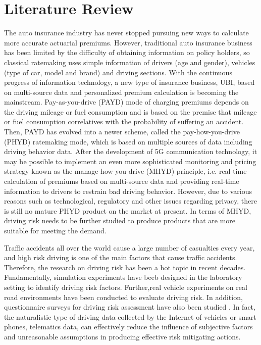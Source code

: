 \documentclass[entropy,article,submit,moreauthors,LaTeX and dvi2pdf]{Definitions/mdpi}
\begin{document}
\section{Literature Review}
The auto insurance industry has never stopped pursuing new ways to calculate more accurate actuarial premiums. However, traditional auto insurance business has been limited by the difficulty of obtaining information on policy holders, so classical ratemaking uses simple information of drivers (age and gender), vehicles (type of car, model and brand) and driving sections\cite{litman2007distance}. With the continuous progress of information technology, a new type of insurance business, UBI, based on multi-source data and personalized premium calculation is becoming the mainstream. Pay-as-you-drive (PAYD) mode of charging premiums depends on the driving mileage or fuel consumption and is based on the premise that mileage or fuel consumption correlatives with the probability of suffering an accident\cite{tselentis2016innovative}. Then, PAYD has evolved into a newer scheme, called the pay-how-you-drive (PHYD) ratemaking mode, which is based on multiple sources of data including driving behavior data\cite{paefgen2013evaluation}. After the development of 5G communication technology, it may be possible to implement an even more sophisticated monitoring and pricing strategy known as the manage-how-you-drive (MHYD) principle, i.e. real-time calculation of premiums based on multi-source data and providing real-time information to drivers to restrain bad driving behavior\cite{litman2007distance,tselentis2017innovative}. However, due to various reasons such as technological, regulatory and other issues regarding privacy\cite{troncoso2010pripayd}, there is still no mature PHYD product on the market at present\cite{pesantez2019predicting,guillen2019use}. In terms of MHYD, driving risk needs to be further studied to produce products that are more suitable for meeting the demand\cite{sun2020assessing}.

Traffic accidents all over the world cause a large number of casualties every year, and high risk driving is one of the main factors that cause traffic accidents\cite{litman2007distance}. Therefore, the research on driving risk has been a hot topic in recent decades. Fundamentally, simulation experiments have beeb designed in the laboratory setting to identify driving risk factors\cite{de2013analysis,siordia2014subjective,charlton2014s,peng2018intelligent}. Further,real vehicle experiments on real road environments have been conducted to evaluate driving risk\cite{wang2015driving,yan2016hazardous,liao2018cross,jiang2019real,yan2019driving}. In addition, questionnaire surveys for driving risk assessment have also been studied \cite{lu2013focusing,wang2020driving}. In fact, the naturalistic type of driving data collected by the Internet of vehicles or smart phones, telematics data, can effectively reduce the influence of subjective factors and unreasonable assumptions in producing effective risk mitigating actions\cite{handel2014insurance,joubert2016combining,verbelen2018unravelling,ma2018use,jiang2020drivers}.
\end{document}
